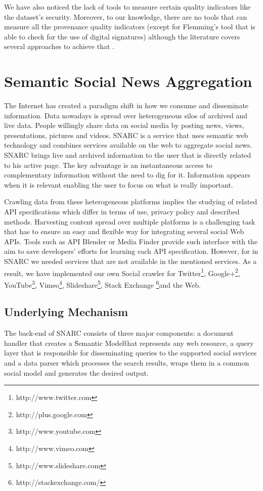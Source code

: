 \documentclass[onecolumn, crcready]{iosart2c}
\begin{document}
We have also noticed the lack of tools to measure certain quality indicators like the dataset's security. Moreover, to our knowledge, there are no tools that can measure all the provenance quality indicators (except for Flemming's tool that is able to check for the use of digital signatures) although the literature covers several approaches to achieve that \cite{Hartig09usingweb}\cite{Flouris2012}\cite{Harth2009}.

\section{Semantic Social News Aggregation}

The Internet has created a paradigm shift in how we consume and disseminate information. Data nowadays is spread over heterogeneous silos of archived and live data. People willingly share data on social media by posting news, views, presentations, pictures and videos. SNARC is a service that uses semantic web technology and combines services available on the web to aggregate social news. SNARC brings live and archived information to the user that is directly related to his active page. The key advantage is an instantaneous access to complementary information without the need to dig for it. Information appears when it is relevant enabling the user to focus on what is really important.

Crawling data from these heterogeneous platforms implies the studying of related API specifications which differ in terms of use, privacy policy and described methods. Harvesting content spread over multiple platforms is a challenging task that has to ensure an easy and flexible way for integrating several social Web APIs. Tools such as API Blender \cite{journals/corr/abs-1301-2086} or Media Finder \cite{conf/chi/KangS03} provide such interface with the aim to save developers' efforts for learning each API specification. However, for in SNARC we needed services that are not available in the mentioned services. As a result, we have implemented our own Social crawler for Twitter\footnote{http://www.twitter.com}, Google+\footnote{http://plus.google.com}, YouTube\footnote{http://www.youtube.com}, Vimeo\footnote{http://www.vimeo.com}, Slideshare\footnote{http://www.slideshare.com}, Stack Exchange \footnote{http://stackexchange.com/}and the Web.

\subsection{Underlying Mechanism}
The back-end of SNARC consists of three major components: a document handler that creates a \"Semantic Model\" that represents any web resource, a query layer that is responsible for disseminating queries to the supported social services and a data parser which processes the search results, wraps them in a common social model and generates the desired output.
\end{document}

